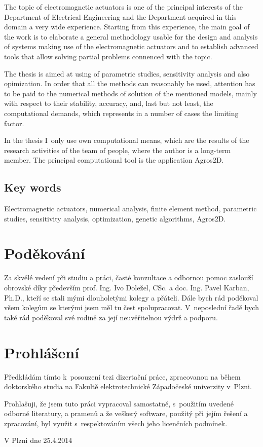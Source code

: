 The topic of electromagnetic actuators is one of the principal interests of the Department of Electrical Engineering and the Department acquired in this domain a very wide experience. Starting from this experience, the main goal of the work is to elaborate a general methodology usable for the design and analysis of systems making use of the electromagnetic actuators and to establish advanced tools that allow solving partial problems connenced with the topic. 

The thesis is aimed at using of parametric studies, sensitivity analysis and also opimization. In order that all the methods can reasonably be used, attention has to be paid to the numerical methods of solution of the mentioned models, mainly with respect to their stability, accuracy, and, last but not least, the computational demands, which represents in a number of cases the limiting factor.

In the thesis I~only use own computational means, which are the results of the research activities of the team of people, where the author is a long-term member. The principal computational tool is the application Agros2D.

\section*{Key words}
Electromagnetic actuators, numerical analysis, finite element method, parametric studies, sensitivity analysis, optimization, genetic algorithms, Agros2D.

\chapter*{Poděkování}
Za skvělé vedení při studiu a práci, časté konzultace a odbornou pomoc zaslouží obrovské díky především prof. Ing. Ivo Doležel, CSc. a doc. Ing. Pavel Karban, Ph.D., kteří se stali mými dlouholetými kolegy a přáteli. Dále bych rád poděkoval všem kolegům se kterými jsem měl tu čest spolupracovat. V~neposlední řadě bych také rád poděkoval své rodině za její neuvěřitelnou výdrž a podporu.

\chapter*{Prohlášení}
Předkládám tímto k~posouzení tezi dizertační práce, zpracovanou na během doktorského studia na Fakultě elektrotechnické Západočeské univerzity v~Plzni.

Prohlašuji, že jsem tuto práci vypracoval samostatně, s~použitím uvedené odborné literatury, a pramenů a že veškerý software, použitý při jejím řešení a zpracování, byl využit s~respektováním všech jeho licenčních podmínek.

\vspace{3em}V Plzni dne 25.4.2014
